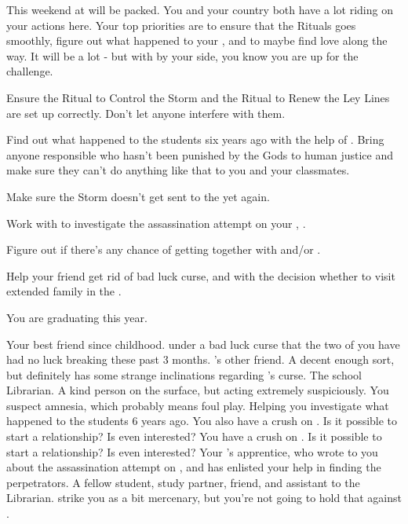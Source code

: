 \documentclass[char]{GL2020}
\begin{document}
This weekend at \pSchool{} will be packed. You and your country both have a lot riding on your actions here. Your top priorities are to ensure that the Rituals goes smoothly, figure out what happened to your \cHeadDiplomat{\Auncle} \cHeadDiplomat{}, and to maybe find love along the way. It will be a lot - but with \cInitiate{} by your side, you know you are up for the challenge.

\begin{itemz}
	\item Ensure the Ritual to Control the Storm and the Ritual to Renew the Ley Lines are set up correctly. Don't let anyone interfere with them.
	\item Find out what happened to the students six years ago with the help of \cHeir{}. Bring anyone responsible who hasn't been punished by the Gods to human justice and make sure they can't do anything like that to you and your classmates.
	\item Make sure the Storm doesn't get sent to the \pShip{} yet again.
	\item Work with \cJuniorStatesman{} to investigate the assassination attempt on your \cHeadDiplomat{\auncle}, \cHeadDiplomat{}.
	\item Figure out if there's any chance of getting together with \cHeir{} and/or \cChupStudent{}.
	\item Help your friend \cInitiate{} get rid of \cInitiate{\their} bad luck curse, and with the decision whether to visit \cInitiate{\their} extended family in the \pFarm{}.
\end{itemz}

\begin{itemz}[Notes]
	\item You are graduating this year.
\end{itemz}

\begin{contacts}
	\contact{\cInitiate{}} Your best friend since childhood. \cInitiate{\Theyare} under a bad luck curse that the two of you have had no luck breaking these past 3 months.
	\contact{\cWarlordDaughter{}} \cInitiate{}'s other friend. A decent enough sort, but definitely has some strange inclinations regarding \cInitiate{}'s curse.
\contact{\cLibrarian{}} The school Librarian. A kind person on the surface, but acting extremely suspiciously. You suspect amnesia, which probably means foul play.
	\contact{\cHeir{}} Helping you investigate what happened to the students 6 years ago. You also have a crush on \cHeir{\them}. Is it possible to start a relationship? Is \cHeir{} even interested?
	\contact{\cChupStudent{}} You have a crush on \cChupStudent{\them}. Is it possible to start a relationship? Is \cChupStudent{} even interested?
	\contact{\cJuniorStatesman{}} Your \cHeadDiplomat{\Auncle} \cHeadDiplomat{}'s apprentice, who wrote to you about the assassination attempt on \cHeadDiplomat{}, and has enlisted your help in finding the perpetrators.
	\contact{\cLibAssist{}} A fellow student, study partner, friend, and assistant to the Librarian. \cLibAssist{\They} strike\cLibAssist{\plural} you as a bit mercenary, but you're not going to hold that against \cLibAssist{\them}.
\end{contacts}
\end{document}
